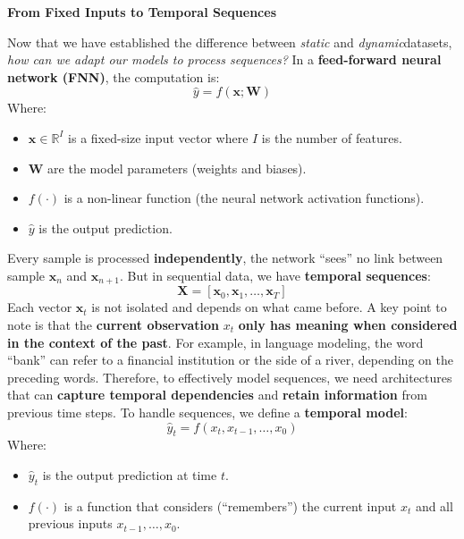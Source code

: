 \highspace
\begin{flushleft}
    \textcolor{Green3}{ \textbf{From Fixed Inputs to Temporal Sequences}}
\end{flushleft}
Now that we have established the difference between \emph{static} and \emph{dynamic}\break datasets, \emph{how can we adapt our models to process sequences?} In a \textbf{feed-forward neural network (FNN)}, the computation is:
\begin{equation*}
    \hat{y} = f\left(\mathbf{x}; \mathbf{W}\right)
\end{equation*}
Where:
\begin{itemize}
    \item $\mathbf{x} \in \mathbb{R}^{I}$ is a fixed-size input vector where $I$ is the number of features.
    \item $\mathbf{W}$ are the model parameters (weights and biases).
    \item $f(\cdot)$ is a non-linear function (the neural network activation functions).
    \item $\hat{y}$ is the output prediction.
\end{itemize}
Every sample is processed \textbf{independently}, the network ``sees'' no link between sample $\mathbf{x}_n$ and $\mathbf{x}_{n+1}$. But in sequential data, we have \textbf{temporal sequences}:
\begin{equation*}
    \mathbf{X} = \left[\mathbf{x}_0, \mathbf{x}_1, \dots, \mathbf{x}_T\right]
\end{equation*}
Each vector $\mathbf{x}_t$ is not isolated and depends on what came before. A key point to note is that the \textbf{current observation} $x_t$ \textbf{only has meaning when considered in the context of the past}. For example, in language modeling, the word ``bank'' can refer to a financial institution or the side of a river, depending on the preceding words. Therefore, to effectively model sequences, we need architectures that can \textbf{capture temporal dependencies} and \textbf{retain information} from previous time steps. To handle sequences, we define a \textbf{temporal model}:
\begin{equation}
    \hat{y}_t = f\left(x_t, x_{t-1}, \dots, x_0\right)
\end{equation}
Where:
\begin{itemize}
    \item $\hat{y}_t$ is the output prediction at time $t$.
    \item $f(\cdot)$ is a function that considers (``remembers'') the current input $x_t$ and all previous inputs $x_{t-1}, \dots, x_0$.
\end{itemize}
